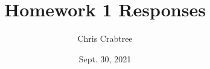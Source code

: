 \documentclass[12pt]{article}
\begin{document}
\title{Homework 1 Responses}
\author{Chris Crabtree}
\date{Sept. 30, 2021}

{
\let\clearpage\relax
\maketitle
}


      













\end{document}
